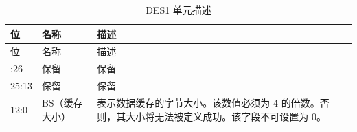 
\begin{longtable}[c]{ |p{3cm}|p{4cm}|p{8cm}| }
\caption{DES1 单元描述} \label{tab:sdhost-DES1}\\
\hline
\rowcolor{lightgray}
位 &名称 & 描述 \\
\hline
\endfirsthead
\hline
\rowcolor{lightgray}
位 &名称 & 描述  \\
\hline
\endhead
\endfoot
31:26 & 保留& 保留  \\\hline
25:13 & 保留& 保留\\\hline
\multirow{3}{*}{12:0} & \multirow{3}{*}{BS（缓存大小）}&  表示数据缓存的字节大小。该数值必须为 4 的倍数。否则，其大小将无法被定义成功。该字段不可设置为 0。\\\hline
\end{longtable}
